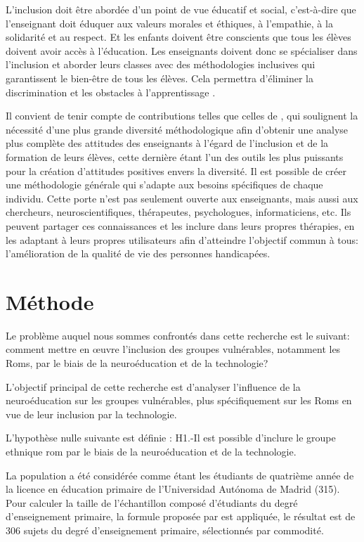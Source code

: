 \documentclass[french]{textolivre}
\begin{document}
L'inclusion doit être abordée d'un point de vue éducatif et social, c'est-à-dire que l'enseignant doit éduquer aux valeurs morales et éthiques, à l'empathie, à la solidarité et au respect. Et les enfants doivent être conscients que tous les élèves doivent avoir accès à l'éducation. Les enseignants doivent donc se spécialiser dans l'inclusion et aborder leurs classes avec des méthodologies inclusives qui garantissent le bien-être de tous les élèves. Cela permettra d'éliminer la discrimination et les obstacles à l'apprentissage \cite{echeita_sarrionandia_pandemia_2020}.

Il convient de tenir compte de contributions telles que celles de \textcite{lacruz-perez_teachers_2021}, qui soulignent la nécessité d'une plus grande diversité méthodologique afin d'obtenir une analyse plus complète des attitudes des enseignants à l'égard de l'inclusion et de la formation de leurs élèves, cette dernière étant l'un des outils les plus puissants pour la création d'attitudes positives envers la diversité. Il est possible de créer une méthodologie générale qui s'adapte aux besoins spécifiques de chaque individu. Cette porte n'est pas seulement ouverte aux enseignants, mais aussi aux chercheurs, neuroscientifiques, thérapeutes, psychologues, informaticiens, etc. Ils peuvent partager ces connaissances et les inclure dans leurs propres thérapies, en les adaptant à leurs propres utilisateurs afin d'atteindre l'objectif commun à tous: l'amélioration de la qualité de vie des personnes handicapées.

\section{Méthode}\label{sec-normas}
Le problème auquel nous sommes confrontés dans cette recherche est le suivant: comment mettre en œuvre l'inclusion des groupes vulnérables, notamment les Roms, par le biais de la neuroéducation et de la technologie?

L'objectif principal de cette recherche est d'analyser l'influence de la neuroéducation sur les groupes vulnérables, plus spécifiquement sur les Roms en vue de leur inclusion par la technologie.

L'hypothèse nulle suivante est définie : H1.-Il est possible d'inclure le groupe ethnique rom par le biais de la neuroéducation et de la technologie.

La population a été considérée comme étant les étudiants de quatrième année de la licence en éducation primaire de l'Universidad Autónoma de Madrid (315). Pour calculer la taille de l'échantillon composé d'étudiants du degré d'enseignement primaire, la formule proposée par \textcite{murray_estadistica_2005} est appliquée, le résultat est de 306 sujets du degré d'enseignement primaire, sélectionnés par commodité.
\end{document}

